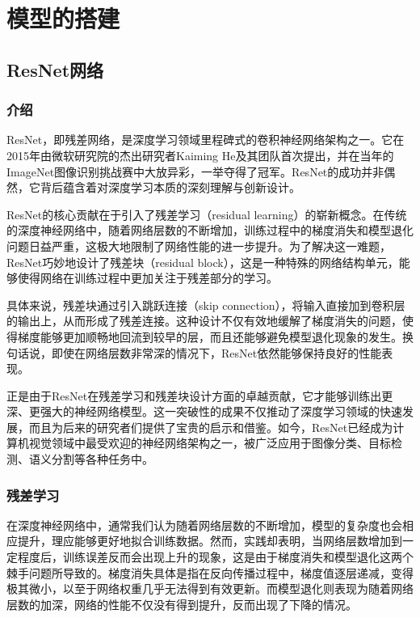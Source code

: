 \chapter{模型的搭建}
\label{chapter:4}

\section{ResNet网络}

\subsection{介绍}

ResNet，即残差网络，是深度学习领域里程碑式的卷积神经网络架构之一。它在2015年由微软研究院的杰出研究者Kaiming He及其团队首次提出，并在当年的ImageNet图像识别挑战赛中大放异彩，一举夺得了冠军。ResNet的成功并非偶然，它背后蕴含着对深度学习本质的深刻理解与创新设计。

ResNet的核心贡献在于引入了残差学习（residual learning）的崭新概念。在传统的深度神经网络中，随着网络层数的不断增加，训练过程中的梯度消失和模型退化问题日益严重，这极大地限制了网络性能的进一步提升。为了解决这一难题，ResNet巧妙地设计了残差块（residual block），这是一种特殊的网络结构单元，能够使得网络在训练过程中更加关注于残差部分的学习。

具体来说，残差块通过引入跳跃连接（skip connection），将输入直接加到卷积层的输出上，从而形成了残差连接。这种设计不仅有效地缓解了梯度消失的问题，使得梯度能够更加顺畅地回流到较早的层，而且还能够避免模型退化现象的发生。换句话说，即使在网络层数非常深的情况下，ResNet依然能够保持良好的性能表现。

正是由于ResNet在残差学习和残差块设计方面的卓越贡献，它才能够训练出更深、更强大的神经网络模型。这一突破性的成果不仅推动了深度学习领域的快速发展，而且为后来的研究者们提供了宝贵的启示和借鉴。如今，ResNet已经成为计算机视觉领域中最受欢迎的神经网络架构之一，被广泛应用于图像分类、目标检测、语义分割等各种任务中。

\subsection{残差学习}

在深度神经网络中，通常我们认为随着网络层数的不断增加，模型的复杂度也会相应提升，理应能够更好地拟合训练数据。然而，实践却表明，当网络层数增加到一定程度后，训练误差反而会出现上升的现象，这是由于梯度消失和模型退化这两个棘手问题所导致的。梯度消失具体是指在反向传播过程中，梯度值逐层递减，变得极其微小，以至于网络权重几乎无法得到有效更新。而模型退化则表现为随着网络层数的加深，网络的性能不仅没有得到提升，反而出现了下降的情况。

